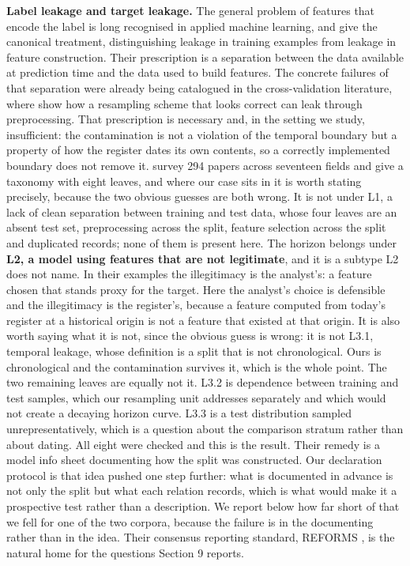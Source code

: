 \documentclass[twoside,11pt]{article}
\begin{document}
\textbf{Label leakage and target leakage.} The general problem of features that encode the label is long recognised in applied machine learning, and \citet{kaufman} give the canonical treatment, distinguishing leakage in training examples from leakage in feature construction. Their prescription is a separation between the data available at prediction time and the data used to build features. The concrete failures of that separation were already being catalogued in the cross-validation literature, where \citet{rao} show how a resampling scheme that looks correct can leak through preprocessing. That prescription is necessary and, in the setting we study, insufficient: the contamination is not a violation of the temporal boundary but a property of how the register dates its own contents, so a correctly implemented boundary does not remove it. \citet{kapoor_leakage} survey 294 papers across seventeen fields and give a taxonomy with eight leaves, and where our case sits in it is worth stating precisely, because the two obvious guesses are both wrong. It is not under L1, a lack of clean separation between training and test data, whose four leaves are an absent test set, preprocessing across the split, feature selection across the split and duplicated records; none of them is present here. The horizon belongs under \textbf{L2, a model using features that are not legitimate}, and it is a subtype L2 does not name. In their examples the illegitimacy is the analyst's: a feature chosen that stands proxy for the target. Here the analyst's choice is defensible and the illegitimacy is the register's, because a feature computed from today's register at a historical origin is not a feature that existed at that origin. It is also worth saying what it is not, since the obvious guess is wrong: it is not L3.1, temporal leakage, whose definition is a split that is not chronological. Ours is chronological and the contamination survives it, which is the whole point. The two remaining leaves are equally not it. L3.2 is dependence between training and test samples, which our resampling unit addresses separately and which would not create a decaying horizon curve. L3.3 is a test distribution sampled unrepresentatively, which is a question about the comparison stratum rather than about dating. All eight were checked and this is the result. Their remedy is a model info sheet documenting how the split was constructed. Our declaration protocol is that idea pushed one step further: what is documented in advance is not only the split but what each relation records, which is what would make it a prospective test rather than a description. We report below how far short of that we fell for one of the two corpora, because the failure is in the documenting rather than in the idea. Their consensus reporting standard, REFORMS \citep{reforms}, is the natural home for the questions Section 9 reports.
\end{document}
